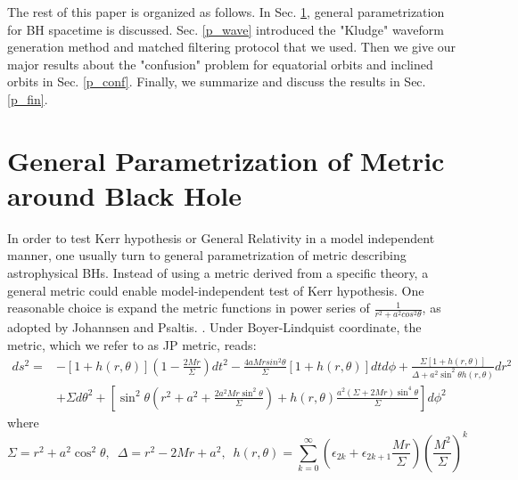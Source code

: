 \documentclass{article}
\begin{document}
The rest of this paper is organized as follows. In Sec. \ref{p_krz}, general parametrization for BH spacetime is discussed. Sec. \ref{p_wave} introduced the "Kludge" waveform generation method and matched filtering protocol that we used. Then we give our major results about the "confusion" problem for equatorial orbits and inclined orbits in Sec. \ref{p_conf}. Finally, we summarize and discuss the results in Sec. \ref{p_fin}. 

\section{General Parametrization of Metric around Black Hole}
\label{p_krz}


In order to test Kerr hypothesis or General Relativity in a model independent manner, one usually turn to general parametrization of metric describing astrophysical BHs. Instead of using a metric derived from a specific theory, a general metric could enable model-independent test of Kerr hypothesis. One reasonable choice is expand the metric functions in power series of $\frac 1 {r^2+a^2cos^2\theta}$, as adopted by Johannsen and Psaltis. \cite{johannsen}. Under Boyer-Lindquist coordinate, the metric, which we refer to as JP metric, reads:
\begin{equation}
\begin{aligned}
	ds^2=&-[1+h(r,\theta)](1-\frac{2Mr}{\Sigma}) dt^2 - \frac{4aMrsin^2\theta}{\Sigma} [1+h(r,\theta)] dtd\phi + \frac{\Sigma[1+ h(r,\theta) ] }{ \Delta + a^2 \sin^2 \theta h(r,\theta )} dr^2  \\
	&+\Sigma d\theta^2 +[ \sin^2\theta (r^2+a^2 + \frac{2a^2Mr\sin^2\theta }{\Sigma}) + h(r,\theta ) \frac{a^2 (\Sigma +2Mr)\sin^4\theta  }{\Sigma} ] d\phi^2
\end{aligned}
\end{equation}
where
\begin{equation}
	\Sigma=r^2 +a^2\cos^2\theta,\,\,\,\Delta= r^2 - 2Mr +a^2 ,\,\,\,  h(r,\theta ) = \sum_{k=0}^{\infty} (\epsilon_{2k} + \epsilon_{2k+1} \frac{Mr}{\Sigma}) (\frac{M^2}{\Sigma})^k
\end{equation}
\end{document}
